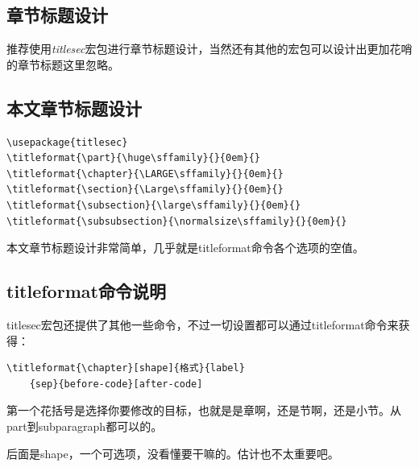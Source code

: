 \documentclass[12pt,oneside]{book}
\begin{document}
\begin{common-format}
\section{章节标题设计}
推荐使用\emph{titlesec}宏包进行章节标题设计，当然还有其他的宏包可以设计出更加花哨的章节标题这里忽略。

\subsection{本文章节标题设计}
\begin{Verbatim}
\usepackage{titlesec}
\titleformat{\part}{\huge\sffamily}{}{0em}{} 
\titleformat{\chapter}{\LARGE\sffamily}{}{0em}{} 
\titleformat{\section}{\Large\sffamily}{}{0em}{}
\titleformat{\subsection}{\large\sffamily}{}{0em}{}
\titleformat{\subsubsection}{\normalsize\sffamily}{}{0em}{}
\end{Verbatim}
本文章节标题设计非常简单，几乎就是titleformat命令各个选项的空值。

\subsection{titleformat命令说明}
titlesec宏包还提供了其他一些命令，不过一切设置都可以通过titleformat命令来获得：
\begin{Verbatim}
\titleformat{\chapter}[shape]{格式}{label}
    {sep}{before-code}[after-code]
\end{Verbatim}
第一个花括号是选择你要修改的目标，也就是是章啊，还是节啊，还是小节。从part到subparagraph都可以的。

后面是shape，一个可选项，没看懂要干嘛的。估计也不太重要吧。


\end{common-format}
\end{document}
